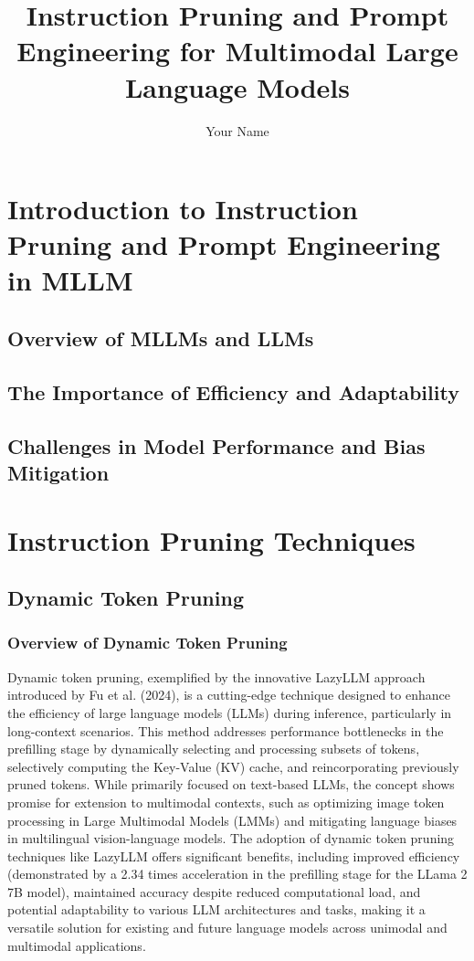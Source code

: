 \documentclass{book}
\begin{document}
\frontmatter
\title{Instruction Pruning and Prompt Engineering for Multimodal Large Language Models}
\author{Your Name}
\maketitle
\tableofcontents

\mainmatter

\chapter{Introduction to Instruction Pruning and Prompt Engineering in MLLM}

\section{Overview of MLLMs and LLMs}
\section{The Importance of Efficiency and Adaptability}
\section{Challenges in Model Performance and Bias Mitigation}

\chapter{Instruction Pruning Techniques}
\section{Dynamic Token Pruning}
\subsection{Overview of Dynamic Token Pruning}
Dynamic token pruning, exemplified by the innovative LazyLLM approach introduced by Fu et al. (2024), is a cutting-edge technique designed to enhance the efficiency of large language models (LLMs) during inference, particularly in long-context scenarios. This method addresses performance bottlenecks in the prefilling stage by dynamically selecting and processing subsets of tokens, selectively computing the Key-Value (KV) cache, and reincorporating previously pruned tokens. While primarily focused on text-based LLMs, the concept shows promise for extension to multimodal contexts, such as optimizing image token processing in Large Multimodal Models (LMMs) and mitigating language biases in multilingual vision-language models. The adoption of dynamic token pruning techniques like LazyLLM offers significant benefits, including improved efficiency (demonstrated by a 2.34 times acceleration in the prefilling stage for the LLama 2 7B model), maintained accuracy despite reduced computational load, and potential adaptability to various LLM architectures and tasks, making it a versatile solution for existing and future language models across unimodal and multimodal applications.
\end{document}

